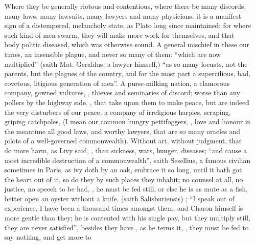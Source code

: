 Where they be generally riotous and contentious, where there be many discords,
many laws, many lawsuits, many lawyers and many physicians, it is a manifest
sign of a distempered, melancholy state, as Plato long
since maintained: for where such kind of men swarm, they will make more work
for themselves, and that body politic diseased, which was otherwise sound. A
general mischief in these our times, an insensible plague, and never so many of
them: \enquote{which are now multiplied} (saith Mat. Geraldus, a
lawyer himself,) \enquote{as so many locusts, not the parents, but the plagues of the
country, and for the most part a supercilious, bad, covetous, litigious
generation of men}.  \etc{} A
purse-milking nation, a clamorous company, gowned vultures,
, thieves and
seminaries of discord; worse than any pollers by the highway side, , \etc{} that take upon
them to make peace, but are indeed the very disturbers of our peace, a company
of irreligious harpies, scraping, griping catchpoles, (I mean our common hungry
pettifoggers, , love and honour in the
meantime all good laws, and worthy lawyers, that are so many
oracles and pilots of a well-governed commonwealth).
Without art, without judgment, that do more harm, as Livy
said, , than sickness, wars, hunger,
diseases; \enquote{and cause a most incredible destruction of a commonwealth}, saith
Sesellius, a famous civilian sometimes in Paris, as ivy
doth by an oak, embrace it so long, until it hath got the heart out of it, so
do they by such places they inhabit; no counsel at all, no justice, no speech
to be had, , he must be fed still, or else he is as
mute as a fish, better open an oyster without a knife. 
(saith Salisburiensis) ; \enquote{I
speak out of experience, I have been a thousand times amongst them, and Charon
himself is more gentle than they; he is contented with his
single pay, but they multiply still, they are never satisfied}, besides they
have , as he terms it, , they must be fed to say nothing, and get more to

